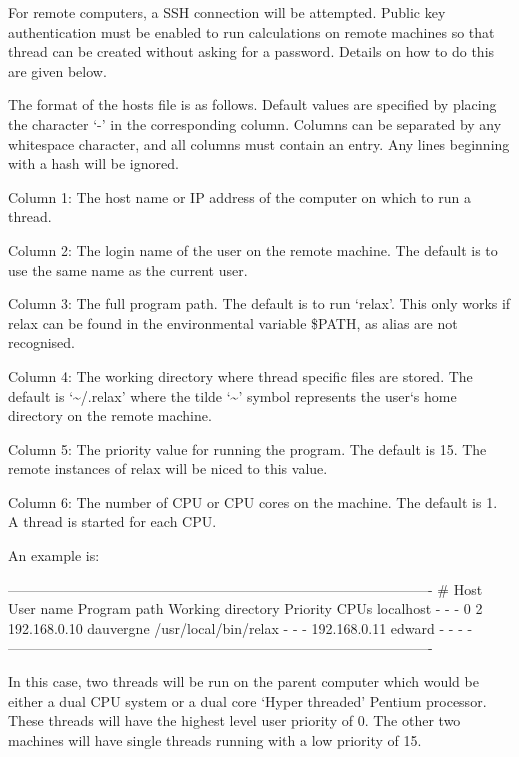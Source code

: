 For remote computers, a SSH connection will be attempted.  Public key authentication must be
enabled to run calculations on remote machines so that thread can be created without asking
for a password.  Details on how to do this are given below.


The format of the hosts file is as follows.  Default values are specified by placing the
character `-' in the corresponding column.  Columns can be separated by any whitespace
character, and all columns must contain an entry.  Any lines beginning with a hash will be
ignored.

Column 1:  The host name or IP address of the computer on which to run a thread.

Column 2:  The login name of the user on the remote machine.  The default is to use the same
name as the current user.

Column 3:  The full program path.  The default is to run `relax'.  This only works if relax
can be found in the environmental variable \$PATH, as alias are not recognised.

Column 4:  The working directory where thread specific files are stored.  The default is
`\~{}/.relax' where the tilde `\~{}' symbol represents the user`s home directory on the remote
machine.

Column 5:  The priority value for running the program.  The default is 15.  The remote
instances of relax will be niced to this value.

Column 6:  The number of CPU or CPU cores on the machine.  The default is 1.  A thread is
started for each CPU.

An example is:

-------------------------------------------------------------------------------------------
\# Host          User name       Program path            Working directory    Priority  CPUs
localhost       -               -                       -                    0         2
192.168.0.10    dauvergne       /usr/local/bin/relax    -                    -         -
192.168.0.11    edward          -                       -                    -         -
-------------------------------------------------------------------------------------------

In this case, two threads will be run on the parent computer which would be either a dual
CPU system or a dual core `Hyper threaded' Pentium processor.  These threads will have the
highest level user priority of 0.  The other two machines will have single threads running
with a low priority of 15.

